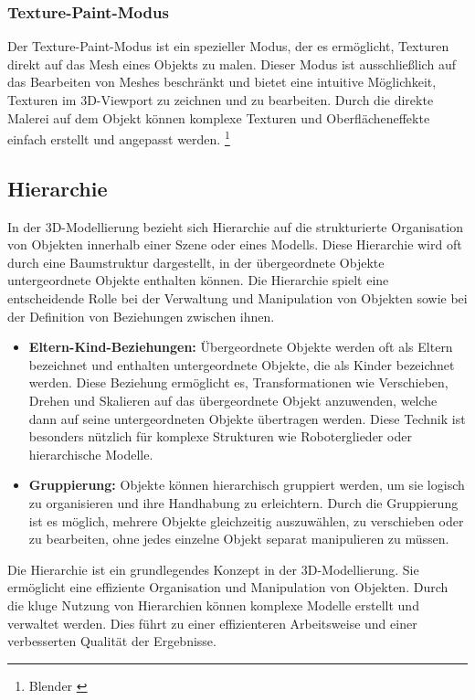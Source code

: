 \subsubsection{Texture-Paint-Modus}
Der Texture-Paint-Modus ist ein spezieller Modus, der es ermöglicht, Texturen direkt auf das Mesh
eines Objekts zu malen. Dieser Modus ist ausschließlich auf das Bearbeiten von Meshes beschränkt und bietet eine intuitive
Möglichkeit, Texturen im 3D-Viewport zu zeichnen und zu bearbeiten. Durch die direkte Malerei auf dem Objekt können
komplexe Texturen und Oberflächeneffekte einfach erstellt und angepasst werden. \footnote{Blender \cite{Mesh}}

\subsection{Hierarchie}
In der 3D-Modellierung bezieht sich Hierarchie auf die strukturierte Organisation von Objekten innerhalb einer Szene
oder eines Modells. Diese Hierarchie wird oft durch eine Baumstruktur dargestellt, in der übergeordnete Objekte
untergeordnete Objekte enthalten können. Die Hierarchie spielt eine entscheidende Rolle bei der Verwaltung und
Manipulation von Objekten sowie bei der Definition von Beziehungen zwischen ihnen.

\begin{itemize}
    \item \textbf{Eltern-Kind-Beziehungen:} Übergeordnete Objekte werden oft als Eltern bezeichnet und enthalten
    untergeordnete Objekte, die als Kinder bezeichnet werden. Diese Beziehung ermöglicht es, Transformationen wie
    Verschieben, Drehen und Skalieren auf das übergeordnete Objekt anzuwenden, welche dann auf seine untergeordneten
    Objekte übertragen werden. Diese Technik ist besonders nützlich für komplexe Strukturen wie Roboterglieder oder
    hierarchische Modelle.
    \item \textbf{Gruppierung:} Objekte können hierarchisch gruppiert werden, um sie logisch zu organisieren und ihre
    Handhabung zu erleichtern. Durch die Gruppierung ist es möglich, mehrere Objekte gleichzeitig auszuwählen, zu
    verschieben oder zu bearbeiten, ohne jedes einzelne Objekt separat manipulieren zu müssen.
\end{itemize}
Die Hierarchie ist ein grundlegendes Konzept in der 3D-Modellierung. Sie ermöglicht eine effiziente Organisation und
Manipulation von Objekten. Durch die kluge Nutzung von Hierarchien können komplexe Modelle erstellt und verwaltet werden.
Dies führt zu einer effizienteren Arbeitsweise und einer verbesserten Qualität der Ergebnisse.

